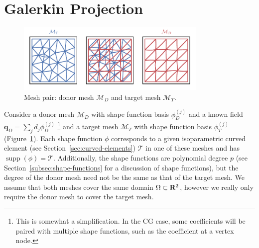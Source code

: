 \section{Galerkin Projection}

\begin{figure}
  \includegraphics[width=0.8125\textwidth]
                  {../images/curved-mesh/main_figure00.pdf}
  \centering
  \captionsetup{width=.75\linewidth}
  \caption{Mesh pair: donor mesh \(\mathcal{M}_D\) and
    target mesh \(\mathcal{M}_T\).}
  \label{fig:donor-target-pair}
\end{figure}

Consider a donor mesh \(\mathcal{M}_D\) with shape function basis
\(\phi_D^{(j)}\) and a known field \(\bm{q}_D = \sum_j d_j \phi_D^{(j)}\)
\footnote{This is somewhat a simplification. In the CG case,
some coefficients will be paired with multiple shape functions, such
as the coefficient at a vertex node.}
and a
target mesh \(\mathcal{M}_T\) with shape function basis \(\phi_T^{(j)}\)
(Figure~\ref{fig:donor-target-pair}).
Each shape function \(\phi\) corresponds to a
given isoparametric curved element (see Section~\ref{sec:curved-elements})
\(\mathcal{T}\) in one of these meshes and has
\(\operatorname{supp}(\phi) = \mathcal{T}\).
Additionally, the shape functions are polynomial degree \(p\) (see
Section~\ref{subsec:shape-functions} for a discussion of shape functions),
but the degree of the donor mesh need not be the same as that of the
target mesh. We assume that both meshes cover the same domain \(\Omega \subset
\mathbf{R}^2\), however we really only require the donor mesh to cover the
target mesh.

